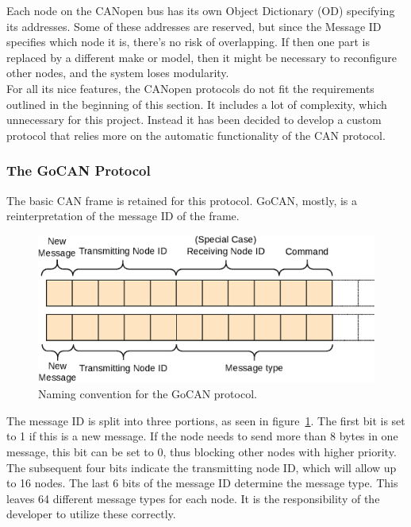 Each node on the CANopen bus has its own Object Dictionary (OD) specifying its addresses. 
Some of these addresses are reserved, but since the Message ID specifies which node it is, there's no risk of overlapping.
If then one part is replaced by a different make or model, then it might be necessary to reconfigure other nodes, and the system loses modularity.\\

For all its nice features, the CANopen protocols do not fit the requirements outlined in the beginning of this section. 
It includes a lot of complexity, which unnecessary for this project.
Instead it has been decided to develop a custom protocol that relies more on the automatic functionality of the CAN protocol.\\

\subsubsection*{The GoCAN Protocol}
The basic CAN frame is retained for this protocol.
GoCAN, mostly, is a reinterpretation of the message ID of the frame.

\begin{figure}[h!]
	\centering
	\includegraphics[width = 0.9\linewidth]{graphics/CAN_protocol_general}
	\caption{Naming convention for the GoCAN protocol.}
	\label{fig:CAN_protocol_general_pdf}
\end{figure}
The message ID is split into three portions, as seen in figure~\ref{fig:CAN_protocol_general_pdf}.
The first bit is set to 1 if this is a new message.
If the node needs to send more than 8 bytes in one message, this bit can be set to 0, thus blocking other nodes with higher priority.
The subsequent four bits indicate the transmitting node ID, which will allow up to 16 nodes. 
The last 6 bits of the message ID determine the message type. 
This leaves 64 different message types for each node.
It is the responsibility of the developer to utilize these correctly.\\


